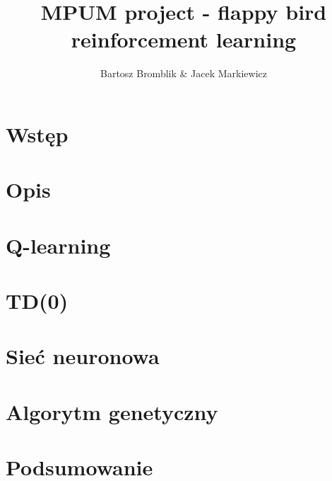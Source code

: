 \documentclass[12pt, A4]{article}
\title{MPUM project - flappy bird reinforcement learning}
\author{Bartosz Bromblik \& Jacek Markiewicz}
\date{}
\begin{document}
\maketitle

\section{Wstęp}


\section{Opis}


\section{Q-learning}


\section{TD(0)}


\section{Sieć neuronowa}


\section{Algorytm genetyczny}


\section{Podsumowanie}
\end{document}
